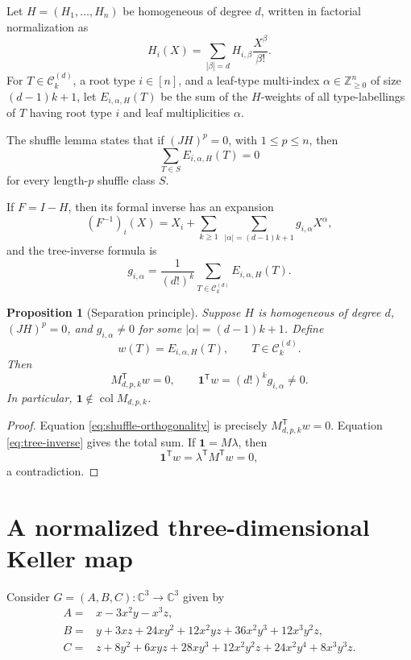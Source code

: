 \documentclass[11pt,reqno]{amsart}
\newtheorem{proposition}[theorem]{Proposition}
\newcommand{\C}{\mathbb C}
\newcommand{\Z}{\mathbb Z}
\newcommand{\cC}{\mathcal C}
\newcommand{\one}{\mathbf 1}
\newcommand{\col}{\operatorname{col}}
\begin{document}
Let $H=(H_1,\ldots,H_n)$ be homogeneous of degree $d$, written in factorial
normalization as
\[
 H_i(X)=\sum_{|\beta|=d} H_{i,\beta}\frac{X^\beta}{\beta!}.
\]
For $T\in\cC_k^{(d)}$, a root type $i\in[n]$, and a leaf-type
multi-index $\alpha\in\Z_{\geq0}^n$ of size $(d-1)k+1$, let
$E_{i,\alpha,H}(T)$ be the sum of the $H$-weights of all type-labellings of
$T$ having root type $i$ and leaf multiplicities $\alpha$.

The shuffle lemma \cite[Lemma~3.3]{BisiEtAl} states that if
$(JH)^p=0$, with $1\leq p\leq n$, then
\begin{equation}\label{eq:shuffle-orthogonality}
 \sum_{T\in S}E_{i,\alpha,H}(T)=0
\end{equation}
for every length-$p$ shuffle class $S$.

If $F=I-H$, then its formal inverse has an expansion
\[
 (F^{-1})_i(X)=X_i+
 \sum_{k\geq1}\ \sum_{|\alpha|=(d-1)k+1}g_{i,\alpha}X^\alpha,
\]
and the tree-inverse formula is
\begin{equation}\label{eq:tree-inverse}
 g_{i,\alpha}
 =\frac{1}{(d!)^k}
 \sum_{T\in\cC_k^{(d)}}E_{i,\alpha,H}(T).
\end{equation}

\begin{proposition}[Separation principle]\label{prop:separation}
Suppose $H$ is homogeneous of degree $d$, $(JH)^p=0$, and
$g_{i,\alpha}\neq0$ for some $|\alpha|=(d-1)k+1$.  Define
\[
 w(T)=E_{i,\alpha,H}(T),\qquad T\in\cC_k^{(d)}.
\]
Then
\[
 M_{d,p,k}^{\mathsf T}w=0,
 \qquad
 \one^{\mathsf T}w=(d!)^k g_{i,\alpha}\neq0.
\]
In particular, $\one\notin\col M_{d,p,k}$.
\end{proposition}

\begin{proof}
Equation \eqref{eq:shuffle-orthogonality} is precisely
$M_{d,p,k}^{\mathsf T}w=0$.  Equation \eqref{eq:tree-inverse} gives the
total sum.  If $\one=M\lambda$, then
\[
 \one^{\mathsf T}w=\lambda^{\mathsf T}M^{\mathsf T}w=0,
\]
a contradiction.
\end{proof}

\section{A normalized three-dimensional Keller map}

Consider $G=(A,B,C):\C^3\to\C^3$ given by
\begin{align}
A={}&x-3x^2y-x^3z,\label{eq:A}\\
B={}&y+3xz+24xy^2+12x^2yz+36x^2y^3+12x^3y^2z,\label{eq:B}\\
C={}&z+8y^2+6xyz+28xy^3+12x^2y^2z+24x^2y^4+8x^3y^3z.
\label{eq:C}
\end{align}
\end{document}
